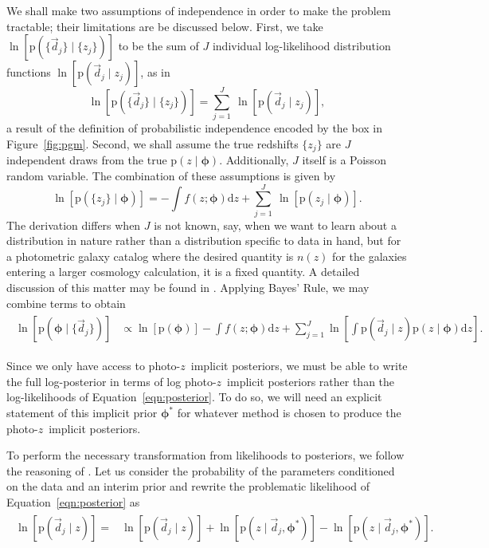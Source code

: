 \documentclass[iop]{emulateapj}
\newcommand{\Eq}[1]{Equation~\ref{#1}}
\newcommand{\Fig}[1]{Figure~\ref{#1}}
\newcommand{\data}{\ensuremath{\vec{d}}}
\newcommand{\pr}[1]{\ensuremath{\mathrm{p}(#1)}}
\newcommand{\gvn}{\mid}
\newcommand{\integral}[2]{\ensuremath{\int #1 \mathrm{d} #2}}
\newcommand{\pz}{photo-$z$}
\newcommand{\pzip}{\pz\ implicit posterior}
\newcommand{\bvec}[1]{\ensuremath{\boldsymbol{#1}}}
\newcommand{\ndphi}{\bvec{\phi}}
\begin{document}
We shall make two assumptions of independence in order to make the problem tractable; 
their limitations are be discussed below.  
First, we take $\ln[\pr{\{\data_{j}\} \gvn \{z_{j}\}}]$ to be the sum of $J$ individual log-likelihood distribution functions $\ln[\pr{\data_{j} \gvn z_{j}}]$, as in 
\begin{equation}
\label{eqn:indiedat}
\ln[\pr{\{\data_{j}\} \gvn \{z_{j}\}}] = \sum_{j=1}^{J}\ \ln[\pr{\data_{j} \gvn z_{j}}],
\end{equation}
a result of the definition of probabilistic independence encoded by the box in \Fig{fig:pgm}.
Second, we shall assume the true redshifts $\{z_{j}\}$ are $J$ independent draws from the true $\pr{z \gvn \ndphi}$.  
Additionally, $J$ itself is a Poisson random variable.  
The combination of these assumptions is given by 
\begin{equation}
\label{eqn:indie}
\ln[\pr{\{z_{j}\} \gvn \ndphi}] = -\integral{f(z; \ndphi)}{z} + \sum_{j=1}^{J}\ \ln[\pr{z_{j} \gvn \ndphi}].
\end{equation}
The derivation differs when $J$ is not known, say, when we want to learn about a distribution in nature rather than a distribution specific to data in hand, but for a photometric galaxy catalog where the desired quantity is $n(z)$ for the galaxies entering a larger cosmology calculation, it is a fixed quantity.
A detailed discussion of this matter may be found in \citet{foreman-mackey_exoplanet_2014}.  
Applying Bayes' Rule, we may combine terms to obtain 
\begin{align}
\begin{split}
\label{eqn:posterior}
\ln[\pr{\ndphi \gvn \{\data_{j}\}}] & \propto \ln[\pr{\ndphi}] - \integral{f(z; \ndphi)}{z} + \sum_{j=1}^{J}\ln\left[\integral{\pr{\data_{j} \gvn z} \pr{z \gvn \ndphi}}{z}\right].
\end{split}
\end{align}

Since we only have access to \pzip s, we must be able to write the full log-posterior in terms of log \pzip s rather than the log-likelihoods of \Eq{eqn:posterior}.
To do so, we will need an explicit statement of this implicit prior $\ndphi^{*}$ for whatever method is chosen to produce the \pzip s.  

To perform the necessary transformation from likelihoods to posteriors, we follow the reasoning of \citet{foreman-mackey_exoplanet_2014}.  
Let us consider the probability of the parameters conditioned on the data and an interim prior and rewrite the problematic likelihood of \Eq{eqn:posterior} as 
\begin{align}
\label{eqn:trick}
\begin{split}
\ln[\pr{\data_{j} \gvn z}] = & \ln[\pr{\data_{j} \gvn z}] + \ln[\pr{z \gvn \data_{j}, \ndphi^{*}}] - \ln[\pr{z \gvn \data_{j}, \ndphi^{*}}].
\end{split}
\end{align}
\end{document}
